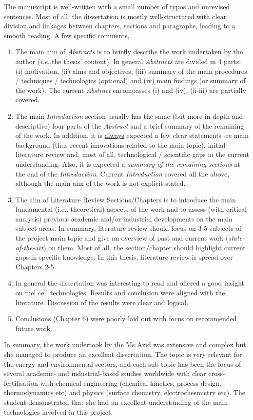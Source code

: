 \documentclass[14pt,twoside]{report}
\newcommand{\ie}{{\it i.e.,}}
\begin{document}
The manuscript is well-written with a small number of typos and unrevised sentences. Most of all, the dissertation is mostly well-structured with clear division and linkages between chapters, sections and paragraphs, leading to a smooth reading. A few specific comments,
\begin{enumerate}
%
\item The main aim of {\it Abstracts} is to briefly describe the work undertaken by the author (\ie the thesis' content). In general {\it Abstracts} are divided in 4 parts: (i) motivation, (ii) aims and objectives, (iii) summary of the main procedures / techniques / technologies (optional) and (iv) main findings (or summary of the work). The current {\it Abstract} encompasses (i) and (iv), (ii-iii) are partially covered.
%
\item The main {\it Introduction} section usually has the same (but more in-depth and descriptive) four parts of the {\it Abstract} and a brief summary of the remaining of the work. In addition, it is \underline{always} expected a few clear statements -re main background (thus recent innovations related to the main topic), initial literature review and, most of all, technological / scientific gaps in the current understanding. Also, it is expected a {\it summary of the remaining sections} at the end of the {\it Introduction}.  Current {\it Introduction} covered all the above, although the main aim of the work is not explicit stated.
%
\item The aim of Literature Review Sections/Chapters is to introduce the main fundamental (i.e., theoretical) aspects of the work and to assess (with critical analysis) previous academic and/or industrial developments on the main subject areas. In summary, literature review should focus on 3-5 subjects of the project main topic and give an overview of past and current work ({\it state-of-the-art}) on them. Most of all, the section/chapter should highlight current gaps in specific knowledge. In this thesis, literature review is spread over Chapters 2-5.
%
\item In general the dissertation was interesting to read and offered a good insight on fuel cell technologies. Results and conclusion were aligned with the literature. Discussion of the results were clear and logical. 
%
\item Conclusions (Chapter 6) were poorly laid out with focus on recommended future work. 
%
\end{enumerate}
In summary, the work undertook by the Ms Azid was extensive and complex but she managed to produce an excellent dissertation. The topic is very relevant for the energy and environmental sectors, and each sub-topic has been the focus of several academic- and industrial-based studies worldwide with clear cross-fertilisation with chemical engineering (chemical kinetics, process design, thermodynamics etc) and physics (surface chemistry, electrochesmistry etc). The student demonstrated that she had an excellent understanding of the main technologies involved in this project.
\end{document}
